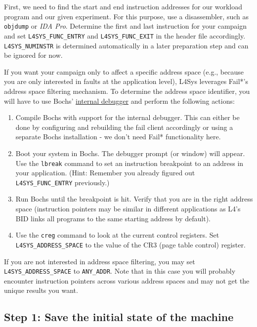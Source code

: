 \documentclass[a4paper,10pt]{article}
\begin{document}
First, we need to find the start and end instruction addresses for our
workload program and our given experiment. For this purpose, use a
disassembler, such as \texttt{objdump} or \emph{IDA Pro}. Determine the first
and last instruction for your campaign and set  \verb+L4SYS_FUNC_ENTRY+ and
\verb+L4SYS_FUNC_EXIT+ in the header file accordingly. \verb+L4SYS_NUMINSTR+
is determined automatically in a later preparation step and can be ignored for
now.

If you want your campaign only to affect a specific address space (e.g.,
because you are only interested in faults at the application level), L4Sys
leverages Fail*'s address space filtering mechanism. To determine the address
space identifier, you will have to use Bochs'
\href{http://bochs.sourceforge.net/doc/docbook/user/internal-debugger.html}{internal
debugger} and perform the following actions:
\begin{enumerate}
  \item Compile Bochs with support for the internal debugger. This can either
        be done by configuring and rebuilding the fail client accordingly or
        using a separate Bochs installation - we don't need Fail*
        functionality here.
  \item Boot your system in Bochs. The debugger prompt (or window) will
        appear. Use the \verb+lbreak+ command to set an instruction breakpoint
        to an address in your application. (Hint: Remember you already figured
        out \verb+L4SYS_FUNC_ENTRY+ previously.)
  \item Run Bochs until the breakpoint is hit. Verify that you are in the
        right address space (instruction pointers may be similar in different
        applications as L4's BID links all programs to the same starting
        address by default).
  \item Use the \verb+creg+ command to look at the current control registers.
        Set \verb+L4SYS_ADDRESS_SPACE+ to the value of the CR3 (page table
        control) register.     
\end{enumerate}

If you are not interested in address space filtering, you may set
\verb+L4SYS_ADDRESS_SPACE+ to \verb+ANY_ADDR+. Note that in this case you will
probably encounter instruction pointers across various address spaces and may
not get the unique results you want.

\subsection{Step 1: Save the initial state of the machine}
\end{document}
